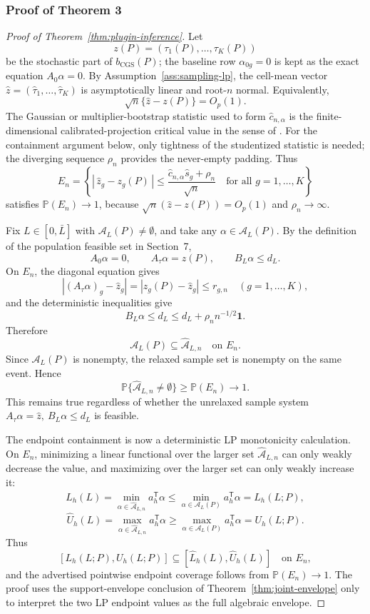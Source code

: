 \documentclass[11pt]{article}
\renewcommand{\Pr}{\mathbb{P}}
\newcommand{\one}{\mathbf{1}}
\newcommand{\transpose}{\mathsf{T}}
\theoremstyle{definition}
\theoremstyle{plain}
\theoremstyle{remark}
\begin{document}
\subsubsection*{Proof of Theorem 3}
\begin{proof}[Proof of Theorem~\ref{thm:plugin-inference}]
Let
\[
  z(P)=(\tau_1(P),\ldots,\tau_K(P))
\]
be the stochastic part of \(b_{\mathrm{CGS}}(P)\); the baseline row
\(\alpha_{0g}=0\) is kept as the exact equation \(A_0\alpha=0\).  By
Assumption~\ref{ass:sampling-lp}, the cell-mean vector
\(\widehat z=(\widehat\tau_1,\ldots,\widehat\tau_K)\) is asymptotically
linear and root-\(n\) normal.  Equivalently,
\[
  \sqrt n\{\widehat z-z(P)\}=O_p(1).
\]
The Gaussian or multiplier-bootstrap statistic used to form
\(\widehat c_{n,\alpha}\) is the finite-dimensional calibrated-projection
critical value in the sense of \cite{KaidoMolinariStoye2019}.  For the
containment argument below, only tightness of the studentized statistic is
needed; the diverging sequence \(\rho_n\) provides the never-empty padding.
Thus
\[
  E_n=
  \left\{
    |\,\widehat z_g-z_g(P)\,|
    \le
    \frac{\widehat c_{n,\alpha}\widehat s_g+\rho_n}{\sqrt n}
    \quad\text{for all }g=1,\ldots,K
  \right\}
\]
satisfies \(\Pr(E_n)\to1\), because \(\sqrt n(\widehat z-z(P))=O_p(1)\) and
\(\rho_n\to\infty\).

Fix \(L\in[0,\bar L]\) with \(\mathcal A_L(P)\ne\emptyset\), and take any
\(\alpha\in\mathcal A_L(P)\).  By the definition of the population feasible
set in Section~7,
\[
  A_0\alpha=0,\qquad A_\tau\alpha=z(P),\qquad B_L\alpha\le d_L .
\]
On \(E_n\), the diagonal equation gives
\[
  |(A_\tau\alpha)_g-\widehat z_g|
  =
  |z_g(P)-\widehat z_g|
  \le r_{g,n}
  \quad(g=1,\ldots,K),
\]
and the deterministic inequalities give
\[
  B_L\alpha\le d_L\le d_L+\rho_n n^{-1/2}\one .
\]
Therefore
\[
  \mathcal A_L(P)\subseteq \widehat{\mathcal A}_{L,n}
  \quad\text{on }E_n .
\]
Since \(\mathcal A_L(P)\) is nonempty, the relaxed sample set is nonempty on
the same event.  Hence
\[
  \Pr\{\widehat{\mathcal A}_{L,n}\ne\emptyset\}\ge \Pr(E_n)\to1 .
\]
This remains true regardless of whether the unrelaxed sample system
\(A_\tau\alpha=\widehat z,\ B_L\alpha\le d_L\) is feasible.

The endpoint containment is now a deterministic LP monotonicity calculation.
On \(E_n\), minimizing a linear functional over the larger set
\(\widehat{\mathcal A}_{L,n}\) can only weakly decrease the value, and
maximizing over the larger set can only weakly increase it:
\[
  \widehat L_h(L)
  =
  \min_{\alpha\in\widehat{\mathcal A}_{L,n}}a_h^\transpose\alpha
  \le
  \min_{\alpha\in\mathcal A_L(P)}a_h^\transpose\alpha
  =
  L_h(L;P),
\]
\[
  \widehat U_h(L)
  =
  \max_{\alpha\in\widehat{\mathcal A}_{L,n}}a_h^\transpose\alpha
  \ge
  \max_{\alpha\in\mathcal A_L(P)}a_h^\transpose\alpha
  =
  U_h(L;P).
\]
Thus
\[
  [L_h(L;P),U_h(L;P)]
  \subseteq
  [\widehat L_h(L),\widehat U_h(L)]
  \quad\text{on }E_n,
\]
and the advertised pointwise endpoint coverage follows from
\(\Pr(E_n)\to1\).  The proof uses the support-envelope conclusion of
Theorem~\ref{thm:joint-envelope} only to interpret the two LP endpoint values
as the full algebraic envelope.


\end{proof}
\end{document}
